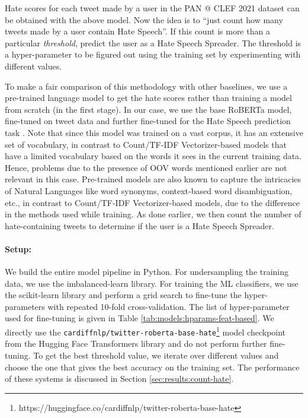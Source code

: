 Hate scores for each tweet made by a user in the PAN @ CLEF 2021 dataset can be obtained with the above model. Now the idea is to ``just count how many tweets made by a user contain Hate Speech''. If this count is more than a particular \textit{threshold}, predict the user as a Hate Speech Spreader. The threshold is a hyper-parameter to be figured out using the training set by experimenting with different values. 


To make a fair comparison of this methodology with other baselines, we use a pre-trained language model to get the hate scores rather than training a model from scratch (in the first stage). In our case, we use the base \ac{RoBERTa} \cite{roberta} model, fine-tuned on tweet data and further fine-tuned for the Hate Speech prediction task \cite{roberta-finetuned}. Note that since this model was trained on a vast corpus, it has an extensive set of vocabulary, in contrast to Count/\ac{TF-IDF} Vectorizer-based models that have a limited vocabulary based on the words it sees in the current training data. Hence, problems due to the presence of OOV words mentioned earlier are not relevant in this case. Pre-trained models are also known to capture the intricacies of Natural Languages like word synonyms, context-based word disambiguation, etc., in contrast to Count/\ac{TF-IDF} Vectorizer-based models, due to the difference in the methods used while training. As done earlier, we then count the number of hate-containing tweets to determine if the user is a Hate Speech Spreader.



\paragraph{Setup:} We build the entire model pipeline in Python. For undersampling the training data, we use the imbalanced-learn \cite{imbalanced-learn} library. For training the ML classifiers, we use the scikit-learn library and perform a grid search to fine-tune the hyper-parameters with repeated 10-fold cross-validation. The list of hyper-parameter used for fine-tuning is given in Table \ref{tab:models:hparams-feat-based}. We directly use the \texttt{cardiffnlp/twitter-roberta-base-hate}\footnote{https://huggingface.co/cardiffnlp/twitter-roberta-base-hate} model checkpoint from the Hugging Face Transformers library and do not perform further fine-tuning. To get the best threshold value, we iterate over different values and choose the one that gives the best accuracy on the training set. The performance of these systems is discussed in Section \ref{sec:results:count-hate}.



